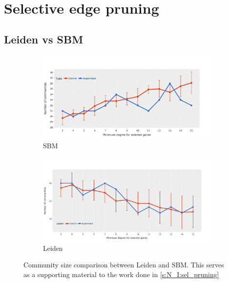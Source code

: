 \chapter{Selective edge pruning} \label{s:ap:sel_prun}

\section{Leiden vs SBM} \label{s:ap:leiden_sbm}

\begin{figure}[!h]
    \centering
    \begin{subfigure}[!t]{1.0\textwidth}
        \includegraphics[width=\textwidth]{Sections/Network_I/Resources/selective_pruning/com_comp/sbm_comNum_sel_prun.png}
        \caption{SBM}
        \label{fig:ap:sbm_com_size}
    \end{subfigure} 
    \begin{subfigure}[!t]{1.0\textwidth}
        \includegraphics[width=\linewidth]{Sections/Network_I/Resources/selective_pruning/leid_comNum_sel_prun.png}
        \caption{Leiden}
        \label{fig:ap:leid_com_size}
    \end{subfigure}\hspace{\fill}  
    \caption{Community size comparison between Leiden and SBM. This serves as a supporting material to the work done in \cref{s:N_I:sel_pruning}}
    \label{fig:ap:com_size_comp}
\end{figure}


